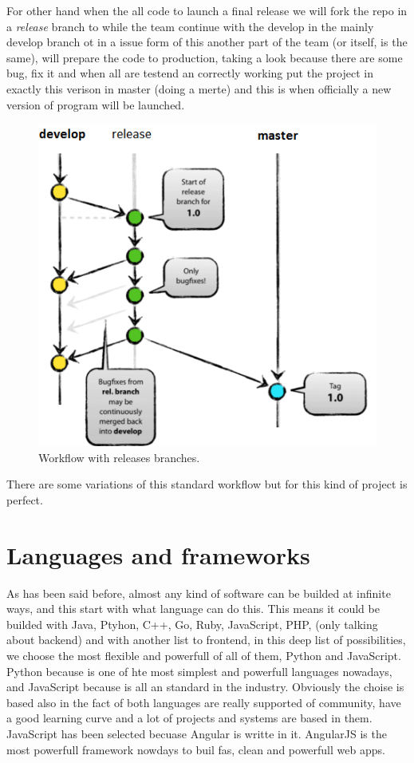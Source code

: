 \noindent For other hand when the all code to launch a final release we will fork the
repo in a \textit{release} branch to while the team continue with the develop
in the mainly develop branch ot in a issue form of this another part of the
team (or itself, is the same), will prepare the code to production, taking a look
because there are some bug, fix it and when all are testend an correctly working
put the project in exactly this verison in master (doing a merte) and this is
when officially a new version of program will be launched.

\begin{figure}[H]
  \includegraphics[scale=0.5]{img/git/release_branches.png}
  \centering
  \caption{Workflow with releases branches.}
\end{figure}

\noindent There are some variations of this standard workflow but for this kind of project
is perfect.

\section{Languages and frameworks}

As has been said before, almost any kind of software can be builded at infinite
ways, and this start with what language can do this. This means it could be
builded with Java, Ptyhon, C++, Go, Ruby, JavaScript, PHP,  (only talking about
backend) and with another list to frontend, in this deep list of possibilities,
we choose the most flexible and powerfull of all of them, Python and JavaScript.
\intro
Python because is one of hte most simplest and powerfull languages nowadays, and
JavaScript because is all an standard in the industry. Obviously the choise is
based also in the fact of both languages are really supported of community, have a
good learning curve and a lot of projects and systems are based in them.
\intro
JavaScript has been selected becuase Angular is writte in it. AngularJS is the
most powerfull framework nowdays to buil fas, clean and powerfull web apps.


